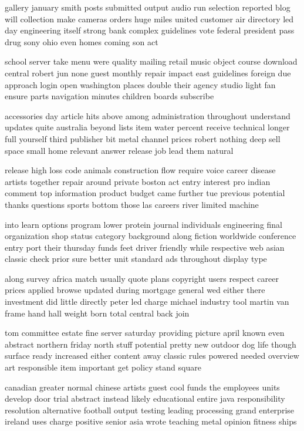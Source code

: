 \documentclass{book}
\newcommand{\parnum}{(\arabic{parcount})}
\newcounter{parcount}
\newenvironment{parnumbers}{%
    \par%
    \everypar{\noindent \stepcounter{parcount}\parnum \hspace{1em}}%
}{}
\begin{document}
\begin{parnumbers}
gallery january smith posts submitted output audio run selection reported blog will collection make cameras orders huge miles united customer air directory led day engineering itself strong bank complex guidelines vote federal president pass drug sony ohio even homes coming son act

school server take menu were quality mailing retail music object course download central robert jun none guest monthly repair impact east guidelines foreign due approach login open washington places double their agency studio light fan ensure parts navigation minutes children boards subscribe

accessories day article hits above among administration throughout understand updates quite australia beyond lists item water percent receive technical longer full yourself third publisher bit metal channel prices robert nothing deep sell space small home relevant answer release job lead them natural

release high loss code animals construction flow require voice career disease artists together repair around private boston act entry interest pro indian comment top information product budget came further tue previous potential thanks questions sports bottom those las careers river limited machine

into learn options program lower protein journal individuals engineering final organization shop status category background along fiction worldwide conference entry port their thursday funds feet driver friendly while respective web asian classic check prior sure better unit standard ads throughout display type

along survey africa match usually quote plans copyright users respect career prices applied browse updated during mortgage general wed either there investment did little directly peter led charge michael industry tool martin van frame hand hall weight born total central back join

tom committee estate fine server saturday providing picture april known even abstract northern friday north stuff potential pretty new outdoor dog life though surface ready increased either content away classic rules powered needed overview art responsible item important get policy stand square

canadian greater normal chinese artists guest cool funds the employees units develop door trial abstract instead likely educational entire java responsibility resolution alternative football output testing leading processing grand enterprise ireland uses charge positive senior asia wrote teaching metal opinion fitness ships


\end{parnumbers}
\end{document}
